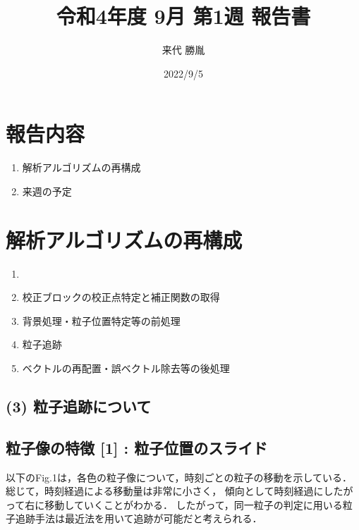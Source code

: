 \documentclass[twocolumn,a4j]{jsarticle}
\author{来代 勝胤}
\title{令和4年度 9月 第1週 報告書}
\date{2022/9/5}
\begin{document}
\columnseprule=0.1mm
\maketitle

\section*{報告内容}
\begin{enumerate}[1.]
  \item 解析アルゴリズムの再構成
  \item 来週の予定
\end{enumerate}

\section{解析アルゴリズムの再構成}
\begin{enumerate}[(1)]
  \item [] \textgt{[ 全体の流れ ]}
  \item 校正ブロックの校正点特定と補正関数の取得
  \item 背景処理・粒子位置特定等の前処理
  \item 粒子追跡
  \item ベクトルの再配置・誤ベクトル除去等の後処理
\end{enumerate}

\subsection{(3) 粒子追跡について}

\subsection*{粒子像の特徴 [1] : 粒子位置のスライド}
以下のFig.1は，各色の粒子像について，時刻ごとの粒子の移動を示している．
総じて，時刻経過による移動量は非常に小さく，
傾向として時刻経過にしたがって右に移動していくことがわかる．
したがって，同一粒子の判定に用いる粒子追跡手法は最近法を用いて追跡が可能だと考えられる．
\end{document}
